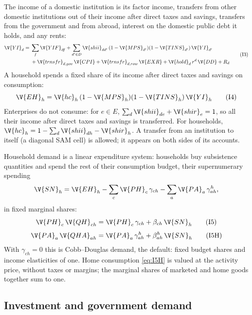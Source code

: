 The income of a domestic institution is its factor income, transfers from
other domestic institutions out of their income after direct taxes and
savings, transfers from the government and from abroad, interest on the
domestic public debt it holds, and any rents:
\begin{equation}
\begin{split}
\V{YI}_d = {}& \sum_f \V{YIF}_{df} + \sum_{d' \in D} \V{shii}_{dd'}\,(1 - \V{MPS}_{d'})(1 - \V{TINS}_{d'})\,\V{YI}_{d'}\\
&+ \V{trnsfr}_{d,gov}\,\V{CPI} + \V{trnsfr}_{d,row}\,\V{EXR} + \V{hold}_d\,r^d\,\V{DD} + R_d
\end{split}
\tag{I3}\label{eq:I3}
\end{equation}
A household spends a fixed share of its income after direct taxes and
savings on consumption:
\begin{equation}
\V{EH}_h = \V{hc}_h\,(1 - \V{MPS}_h)(1 - \V{TINS}_h)\,\V{YI}_h
\tag{I4}\label{eq:I4}
\end{equation}
Enterprises do not consume: for $e \in E$, $\sum_d \V{shii}_{de} + \V{shir}_e = 1$,
so all their income after direct taxes and savings is transferred. For
households, $\V{hc}_h = 1 - \sum_d \V{shii}_{dh} - \V{shir}_h$. A transfer
from an institution to itself (a diagonal SAM cell) is allowed; it appears on
both sides of its accounts.

Household demand is a linear expenditure system: households buy subsistence
quantities and spend the rest of their consumption budget, their
supernumerary spending
\begin{equation*}
\V{SN}_h = \V{EH}_h - \sum_c \V{PH}_c\,\gamma_{ch} - \sum_a \V{PA}_a\,\gamma^h_{ah},
\end{equation*}
in fixed marginal shares:
\begin{equation}
\V{PH}_c\,\V{QH}_{ch} = \V{PH}_c\,\gamma_{ch} + \beta_{ch}\,\V{SN}_h
\tag{I5}\label{eq:I5}
\end{equation}
\begin{equation}
\V{PA}_a\,\V{QHA}_{ah} = \V{PA}_a\,\gamma^h_{ah} + \beta^h_{ah}\,\V{SN}_h
\tag{I5H}\label{eq:I5H}
\end{equation}
With $\gamma_{ch} = 0$ this is Cobb--Douglas demand, the default: fixed budget
shares and income elasticities of one. Home consumption \eqref{eq:I5H} is
valued at the activity price, without taxes or margins; the marginal shares of
marketed and home goods together sum to one.

\subsection{Investment and government demand}

